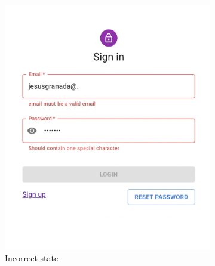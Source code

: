         \begin{figure}[H]
            \centering
            \begin{subfigure}[T]{0.49\textwidth}
                \centering
                \includegraphics[width=\textwidth]{assets/form_incorrect.png}
                \caption{Incorrect state}
                \label{fig:impl_form_incorrect}
            \end{subfigure}
            \hfill
            \begin{subfigure}[T]{0.49\textwidth}
                \centering

\end{subfigure}
\end{figure}
